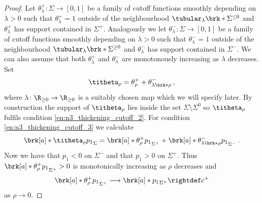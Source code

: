 \begin{proof}
  Let $\theta^+_\lambda\colon \Sigma\to[0,1]$ be a family of cutoff functions smoothly depending on $\lambda>0$ such that
  $\theta^+_\lambda=1$ outside of the neighbourhood $\tubular_{\lambda}\brk*{\Sigma^{\leq0}}$ and $\theta_\lambda^+$ has
  support contained in $\Sigma^+$.
  Analogously we let $\theta^-_\lambda\colon\Sigma\to[0,1]$ be a family of cutoff functions smoothly depending on $\lambda>0$
  such that $\theta^-_\lambda=1$ outside of the neighbourhood $\tubular_{\lambda}\brk*{\Sigma^{\geq0}}$ and $\theta_\lambda^-$ has
  support contained in $\Sigma^-$.
  We can also assume that both $\theta^+_\lambda$ and $\theta^-_\lambda$ are monotonously increasing as $\lambda$ decreases.
  Set 
  \begin{align}
    \titheta_\rho=\theta^+_\rho+\theta^-_{\lambda\brk*{\rho}}
    \label{eq:n3_thickening_cutoff_titheta}\,,
  \end{align}
  where $\lambda\colon\R_{\geq0}\to\R_{\geq0}$
  is a suitably chosen map which we will specify later. By construction the support of $\titheta_\rho$ lies inside 
  the set $\Sigma\setminus\Sigma^0$ so $\titheta_\rho$ fulfils condition \ref{en:n3_thickening_cutoff_2}.
  For condition \ref{en:n3_thickening_cutoff_3}
  we calculate
  \begin{align}
    \brk[a]*{\titheta_\rho p_1}_\Sigma
    =\brk[a]*{\theta_\rho^+p_1}_{\Sigma^+}+\brk[a]*{\theta_{\lambda\brk*{\rho}}^-p_1}_{\Sigma^-}\,.
    \label{eq:n3_thickening_cutoff_meanVal}
  \end{align}
  Now we have that $p_1<0$ on $\Sigma^-$ and that $p_1>0$ on $\Sigma^+$.
  Thus $\brk[a]*{\theta_\rho^+p_1}_{\Sigma^+}>0$ is monotonically increasing as $\rho$ decreases and
  \begin{align*}
    \brk[a]*{\theta_\rho^+p_1}_{\Sigma^+}\longrightarrow \brk[a]*{p_1}_{\Sigma^+}\rightdef c^+
  \end{align*}
  as $\rho\to0$.


\end{proof}
